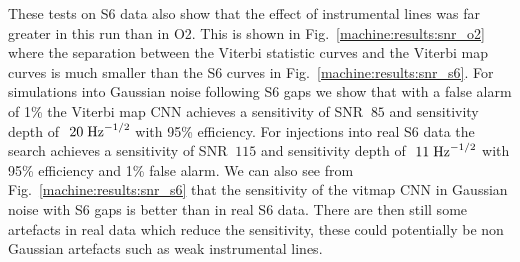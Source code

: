 These tests on S6 data also show
that the effect of instrumental lines was far greater in this run than in O2.
This is shown in Fig.~\ref{machine:results:snr_o2} where the separation between the Viterbi
statistic curves and the Viterbi map curves is much smaller than the S6 curves
in Fig.~\ref{machine:results:snr_s6}. For simulations into Gaussian noise following S6
gaps we show that with a false alarm of 1\% the Viterbi map \gls{CNN} achieves a
sensitivity of SNR $~85$ and sensitivity depth of $~20\; {\rm Hz}^{-1/2}$ with
95\% efficiency. For injections into real S6 data the search achieves a
sensitivity of SNR $~115$ and sensitivity depth of $~11\; {\rm Hz}^{-1/2}$ with
95\% efficiency and 1\% false alarm. We can also see from
Fig.~\ref{machine:results:snr_s6} that the sensitivity of the vitmap \gls{CNN} in Gaussian noise with S6 gaps
is better than in real S6 data.
There are then still some artefacts in real data which reduce the sensitivity, these could potentially be non Gaussian artefacts such as weak instrumental lines.  


